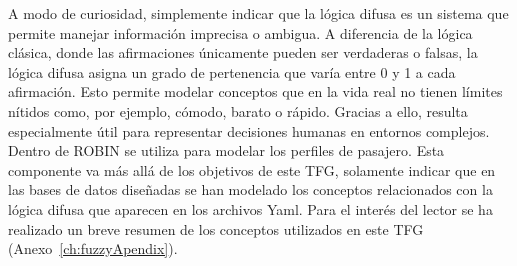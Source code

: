A modo de curiosidad, simplemente indicar que la lógica difusa es un sistema que permite manejar información imprecisa o ambigua. A diferencia de la lógica clásica, donde las afirmaciones únicamente pueden ser verdaderas o falsas, la lógica difusa asigna un grado de pertenencia que varía entre 0 y 1 a cada afirmación. Esto permite modelar conceptos que en la vida real no tienen límites nítidos como, por ejemplo, cómodo, barato o rápido. Gracias a ello, resulta especialmente útil para representar decisiones humanas en entornos complejos. Dentro de \acrshort{ROBIN} se utiliza para modelar los perfiles de pasajero. Esta componente va más allá de los objetivos de este \acrshort{TFG}, solamente indicar que en las bases de datos diseñadas se han modelado los conceptos relacionados con la lógica difusa que aparecen en los archivos \acrshort{Yaml}. Para el interés del lector se ha realizado un breve resumen de los conceptos utilizados en este \acrshort{TFG} (Anexo~\ref{ch:fuzzyApendix}). 

